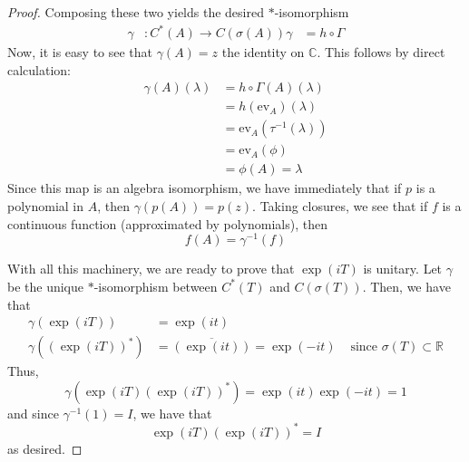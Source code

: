 \documentclass[fontsize=11pt]{scrartcl} %
\numberwithin{equation}{section} %
\numberwithin{figure}{section} %
\numberwithin{table}{section} %
\newcommand{\R}{\mathbb{R}}
\newcommand{\C}{\mathbb{C}}
\begin{document}
\begin{proof}
    Composing these two yields the desired $*$-isomorphism
    \[
        \begin{aligned}
    \gamma&:C^*(A)\to C(\sigma(A))
    \gamma &= h\circ \Gamma
\end{aligned}
    \]
    Now, it is easy to see that $\gamma(A) = z$ the identity on $\C$. This
    follows by direct calculation:
    \[
        \begin{aligned}
            \gamma(A)(\lambda) &= h\circ\Gamma(A)(\lambda)\\
            &= h(\text{ev}_A)(\lambda)\\
            &= \text{ev}_A(\tau^{-1}(\lambda))\\
            &= \text{ev}_A(\phi)\\
            &=\phi(A) = \lambda
    \end{aligned}
    \]
    Since this map is an algebra isomorphism, we have immediately that if $p$ is
    a polynomial in $A$, then $\gamma(p(A)) = p(z)$. Taking closures, we see
    that if $f$ is a continuous function (approximated by polynomials), then
    \[
        f(A) = \gamma^{-1}(f)
    \]

    With all this machinery, we are ready to prove that $\exp(iT)$ is unitary.
    Let $\gamma$ be the unique $*$-isomorphism between $C^*(T)$ and
    $C(\sigma(T))$. Then, we have that
    \[
        \begin{aligned}
        \gamma(\exp(iT)) &= \exp(it)\\
        \gamma((\exp(iT))^*) &= \overline{(\exp(it))}=\exp(-it) &\text{ since
        $\sigma(T)\subset \R$}
    \end{aligned}
    \]
    Thus,
    \[
        \gamma(\exp(iT)(\exp(iT))^*) = \exp(it)\exp(-it) = 1
    \]
    and since $\gamma^{-1}(1)=I$, we have that
    \[
        \exp(iT)(\exp(iT))^* = I
    \]
    as desired.
\end{proof}

\newpage
\end{document}
